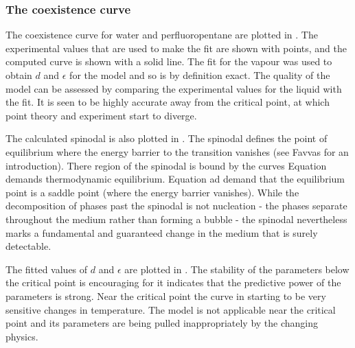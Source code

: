 \subsubsection{The coexistence curve}

The coexistence curve for water and perfluoropentane are plotted in .
The experimental values that are used to make the fit are shown with points,
and the computed curve is shown with a solid line.  
The fit for the vapour was  used to obtain $d$ and $\epsilon$ for the model and so is by definition exact.
The quality of the model can be assessed by comparing the experimental values for the liquid with the fit.
It is seen to be highly accurate away from the critical point, 
at which point theory and experiment start to diverge.


The calculated spinodal is also plotted in .
The spinodal defines the point of equilibrium where the energy barrier to the transition vanishes (see Favvas\cite{Favvas2008} for an introduction).
There region of the spinodal is bound by the curves
Equation   demands thermodynamic equilibrium.
Equation   ad    demand that the equilibrium point is a saddle point (where the energy barrier vanishes).
%
While the decomposition of phases past the spinodal is not  nucleation -
the phases separate throughout the medium rather than forming a bubble -
the spinodal nevertheless marks a fundamental and guaranteed  change in the medium that is surely detectable.

The fitted values of $d$ and $\epsilon$ are plotted in .
The stability of the parameters below the critical point is encouraging
for it indicates that the predictive power of the parameters is strong.
Near the critical point the curve in 
starting to be very sensitive changes in temperature.
The model is not applicable near the critical point 
and its parameters are being pulled inappropriately by the changing 
physics.


